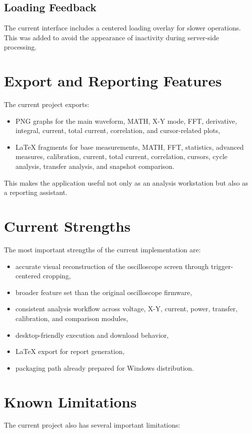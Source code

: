 \documentclass[conference]{IEEEtran}
\begin{document}
\subsection{Loading Feedback}
The current interface includes a centered loading overlay for slower operations. This was added to avoid the appearance of inactivity during server-side processing.

\section{Export and Reporting Features}
The current project exports:

\begin{itemize}
    \item PNG graphs for the main waveform, MATH, X-Y mode, FFT, derivative, integral, current, total current, correlation, and cursor-related plots,
    \item LaTeX fragments for base measurements, MATH, FFT, statistics, advanced measures, calibration, current, total current, correlation, cursors, cycle analysis, transfer analysis, and snapshot comparison.
\end{itemize}

This makes the application useful not only as an analysis workstation but also as a reporting assistant.

\section{Current Strengths}
The most important strengths of the current implementation are:

\begin{itemize}
    \item accurate visual reconstruction of the oscilloscope screen through trigger-centered cropping,
    \item broader feature set than the original oscilloscope firmware,
    \item consistent analysis workflow across voltage, X-Y, current, power, transfer, calibration, and comparison modules,
    \item desktop-friendly execution and download behavior,
    \item LaTeX export for report generation,
    \item packaging path already prepared for Windows distribution.
\end{itemize}

\section{Known Limitations}
The current project also has several important limitations:
\end{document}
